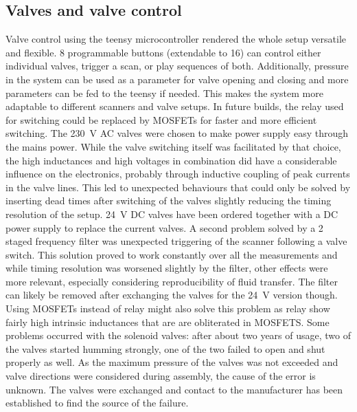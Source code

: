         \subsection{Valves and valve control}
            Valve control using the teensy microcontroller rendered the whole setup versatile and flexible. 8 programmable buttons (extendable to 16) can control either individual valves, trigger a scan, or play sequences of both. Additionally, pressure in the system can be used as a parameter for valve opening and closing and more parameters can be fed to the teensy if needed. This makes the system more adaptable to different scanners and valve setups. In future builds, the relay used for switching could be replaced by MOSFETs for faster and more efficient switching. 
            The \SI{230}{\volt} AC valves were chosen to make power supply easy through the mains power. While the valve switching itself was facilitated by that choice, the high inductances and high voltages in combination did have a considerable influence on the electronics, probably through inductive coupling of peak currents in the valve lines. This led to unexpected behaviours that could only be solved by inserting dead times after switching of the valves slightly reducing the timing resolution of the setup. \SI{24}{\volt} DC valves have been ordered together with a DC power supply to replace the current valves. A second problem solved by a 2 staged frequency filter was unexpected triggering of the scanner following a valve switch. This solution proved to work constantly over all the measurements and while timing resolution was worsened slightly by the filter, other effects were more relevant, especially considering reproducibility of fluid transfer. The filter can likely be removed after exchanging the valves for the \SI{24}{\volt} version though. Using MOSFETs instead of relay might also solve this problem as relay show fairly high intrinsic inductances that are are obliterated in MOSFETS. 
            Some problems occurred with the solenoid valves: after about two years of usage, two of the valves started humming strongly, one of the two failed to open and shut properly as well. As the maximum pressure of the valves was not exceeded and valve directions were considered during assembly, the cause of the error is unknown. The valves were exchanged and contact to the manufacturer has been established to find the source of the failure.
